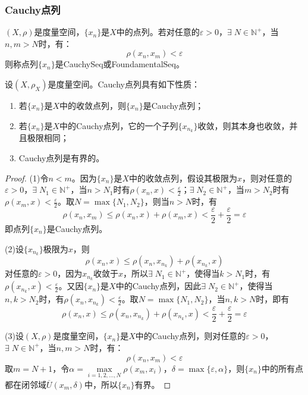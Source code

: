 \subsubsection{Cauchy点列}
\begin{definition}
	$(X,\rho)$是度量空间，$\{x_n\}$是$X$中的点列。若对任意的$\varepsilon>0$，$\exists\;N\in\mathbb{N}^+$，当$n,m>N$时，有：
	\begin{equation*}
		\rho(x_n,x_m)<\varepsilon
	\end{equation*}
	则称点列$\{x_n\}$是\gls{CauchySeq}或\gls{FoundamentalSeq}。
\end{definition}
\begin{property}\label{prop:CauchySeq}
	设$(X,\rho_X)$是度量空间。Cauchy点列具有如下性质：
	\begin{enumerate}
		\item 若$\{x_n\}$是$X$中的收敛点列，则$\{x_n\}$是Cauchy点列；
		\item 若$\{x_n\}$是$X$中的Cauchy点列，它的一个子列$\{x_{n_k}\}$收敛，则其本身也收敛，并且极限相同；
		\item Cauchy点列是有界的。
	\end{enumerate}
\end{property}
\begin{proof}
	(1)令$n<m$。因为$\{x_n\}$是$X$中的收敛点列，假设其极限为$x$，则对任意的$\varepsilon>0$，$\exists\; N_1\in\mathbb{N}^+$，当$n>N_1$时有$\rho(x_n,x)<\frac{\varepsilon}{2}$；$\exists\; N_2\in\mathbb{N}^+$，当$m>N_2$时有$\rho(x_m,x)<\frac{\varepsilon}{2}$。取$N=\max\{N_1,N_2\}$，则当$n>N$时，有
	\begin{equation*}
		\rho(x_n,x_m)\leqslant\rho(x_n,x)+\rho(x_m,x)<\frac{\varepsilon}{2}+\frac{\varepsilon}{2}=\varepsilon
	\end{equation*}
	即点列$\{x_n\}$是Cauchy点列。\par
	(2)设$\{x_{n_k}\}$极限为$x$，则
	\begin{equation*}
		\rho(x_n,x)\leqslant\rho(x_n,x_{n_k})+\rho(x_{n_k},x)
	\end{equation*}
	对任意的$\varepsilon>0$，因为$x_{n_k}$收敛于$x$，所以$\exists\;N_1\in\mathbb{N}^+$，使得当$k>N_1$时，有$\rho(x_{n_k},x)<\frac{\varepsilon}{2}$。又因$\{x_n\}$是$X$中的Cauchy点列，因此$\exists\;N_2\in\mathbb{N}^+$，使得当$n,k>N_2$时，有$\rho(x_n,x_{n_k})<\frac{\varepsilon}{2}$。取$N=\max\{N_1,N_2\}$，当$n,k>N$时，即有
	\begin{equation*}
		\rho(x_n,x)\leqslant\rho(x_n,x_{n_k})+\rho(x_{n_k},x)<\frac{\varepsilon}{2}+\frac{\varepsilon}{2}=\varepsilon
	\end{equation*}\par
	(3)设$(X,\rho)$是度量空间，$\{x_n\}$是$X$中的Cauchy点列，则对任意的$\varepsilon>0$，$\exists\;N\in\mathbb{N}^+$，当$n,m>N$时，有：
	\begin{equation*}
		\rho(x_n,x_m)<\varepsilon
	\end{equation*}
	取$m=N+1$，令$\alpha=\max\limits_{i=1,2,\dots,N}\rho(x_m,x_i)$，$\delta=\max\{\varepsilon,\alpha\}$，则$\{x_n\}$中的所有点都在闭邻域$\overline{U}(x_m,\delta)$中，所以$\{x_n\}$有界。
\end{proof}
